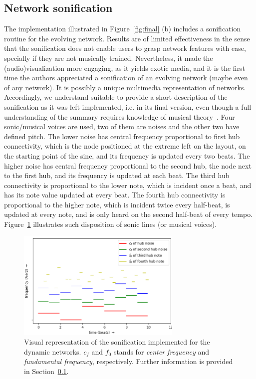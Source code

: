 \documentclass[runningheads]{llncs}
\begin{document}
\subsection{Network sonification}\label{sson}
The implementation illustrated in Figure~\ref{fig:final} (b) includes a sonification routine for the evolving network.
Results are of limited effectiveness in the sense that the sonification does not enable users to grasp network features with ease,
specially if they are not musically trained.
Nevertheless, it made the (audio)visualization more engaging, as it yields exotic media,
and it is the first time the authors appreciated a sonification of an evolving network (maybe even of any network).
It is possibly a unique multimedia representation of networks.
Accordingly, we understand suitable to provide a short description of the sonification as it was left implemented, i.e. in its final version,
even though a full understanding of the summary requires knowledge of musical theory~\cite{mass}.
Four sonic/musical voices are used, two of them are noises and the other two have defined pitch. The lower noise has central frequency proportional to first hub connectivity,
which is the node positioned at the extreme left on the layout, on the starting point of the sine, and its frequency is updated every two beats.
The higher noise has central frequency proportional to the second hub, the node next to the first hub, and its frequency is updated at each beat.
The third hub connectivity is proportional to the lower note,
which is incident once a beat, and has its note value updated at every beat.
The fourth hub connectivity is proportional to the higher note, which is incident twice every half-beat, is updated at every note, and is only heard on the second half-beat of every tempo.
Figure~\ref{fson} illustrates such disposition of sonic lines (or musical voices).

\begin{figure}[!h]\centering
\includegraphics[width=0.7\textwidth]{sonif}
  \caption{Visual representation of the sonification implemented for the dynamic networks.
  $c_f$ and $f_0$ stands for \emph{center frequency} and \emph{fundamental frequency}, respectively.
  Further information is provided in Section~\ref{sson}.
  }\label{fson}
\end{figure}
\end{document}
